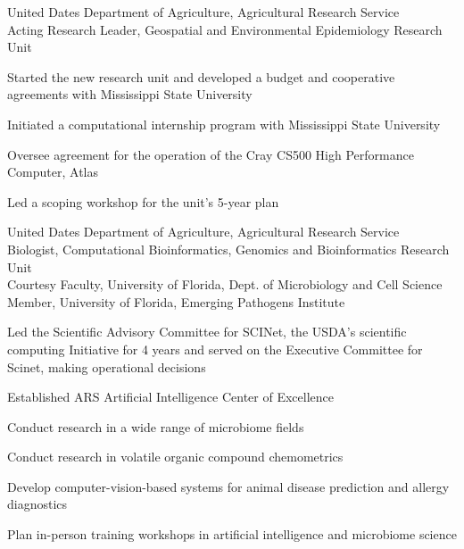 \documentclass[12pt,letterpaper]{report}
\newcommand{\listitemspace}{0.15em}
\renewenvironment{itemize}
{\begin{list}{}{\setlength{\leftmargin}{0em}
            \setlength{\parskip}{0em}
            \setlength{\itemsep}{\listitemspace}
            \setlength{\parsep}{\listitemspace}}}
    {\end{list}}
\begin{document}
    \begin{tablist}
	 \item[2023--]   \tab United Dates Department of Agriculture, Agricultural Research Service \\
	 			Acting Research Leader, Geospatial and Environmental Epidemiology Research Unit\\
				
				\tab \begin{itemize}
                             	\item[$\bullet$] Started the new research unit and developed a budget and cooperative agreements with Mississippi State University
				\item[$\bullet$] Initiated a computational internship program with Mississippi State University
				\item[$\bullet$] Oversee agreement for the operation of the Cray CS500 High Performance Computer, Atlas
				\item[$\bullet$] Led a scoping workshop for the unit's 5-year plan
				\end{itemize}
				
				
        \item[2017--]   \tab United Dates Department of Agriculture, Agricultural Research Service \\
                             Biologist, Computational Bioinformatics, Genomics and Bioinformatics Research Unit\\
                             \tab Courtesy Faculty, University of Florida, Dept. of Microbiology and Cell Science\\
                              \tab  Member, University of Florida, Emerging Pathogens Institute\\
                              
                              \tab \begin{itemize}
				\item[$\bullet$] Led the Scientific Advisory Committee for SCINet, the USDA's scientific computing Initiative  for 4 years and served on the Executive Committee for Scinet, making operational decisions
				\item[$\bullet$] Established ARS Artificial Intelligence Center of Excellence
				\item[$\bullet$] Conduct research in a wide range of microbiome fields
				\item[$\bullet$] Conduct research in volatile organic compound chemometrics
				\item[$\bullet$] Develop computer-vision-based systems for animal disease prediction and allergy diagnostics				
				\item[$\bullet$] Plan in-person training workshops in artificial intelligence and microbiome science 				\end{itemize}
     


\end{tablist}
\end{document}
